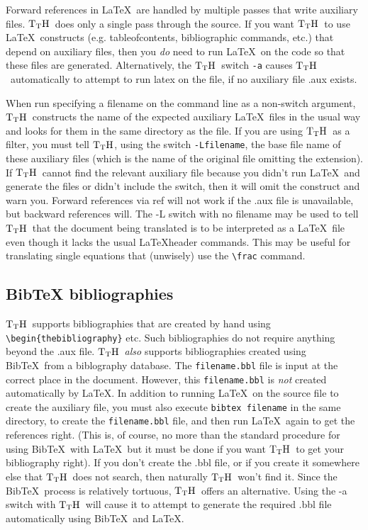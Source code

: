 \documentclass[12pt]{article}
\def\TtH{$\rm{}T_TH$}
\begin{document}
Forward references in \LaTeX\ are handled by multiple passes that write
auxiliary files. \TtH\ does only a single pass through the source.  If
you want \TtH\ to use \LaTeX\ constructs (e.g. tableofcontents,
bibliographic commands, etc.) that depend on auxiliary files, then
you {\em do} need to run \LaTeX\ on the code so that these files are
generated. Alternatively, the \TtH\ switch
\verb+-a+  
causes \TtH\ automatically to attempt to run latex on the file,
if no auxiliary file .aux exists.

When run specifying a filename on the command line as a non-switch
argument, \TtH\ constructs the name of the expected auxiliary \LaTeX\
files in the usual way and looks for them in the same directory as the
file. 
If you are using \TtH\ as a filter, you must tell \TtH, using the
switch \verb!-Lfilename!, the base file name of these auxiliary files
(which is the name of the original file omitting the extension). If
\TtH\ cannot find the relevant auxiliary file because you didn't run
\LaTeX\ and generate the files or didn't include the switch, then it
will omit the construct and warn you.\index{references!forward}
Forward references via ref will not work if the .aux file is
unavailable, but backward references will. The -L switch with no
filename may be used to tell \TtH\ that the document being translated
is to be interpreted as a \LaTeX\ file even though it lacks the usual
\LaTeX header commands. This may be useful for translating single
equations that (unwisely) use the \verb|\frac| command.


\subsection{BibTeX bibliographies\label{bibtex}}

\TtH\ supports bibliographies that are created by hand using
\verb!\begin{thebibliography}! etc. Such bibliographies do not require
anything beyond the .aux file. \TtH\ \emph{also} supports
bibliographies created using Bib\TeX\ from a biblography database. The
\verb!filename.bbl! file is input at the correct place in the
document. However, this \verb!filename.bbl!  is \emph{not} created
automatically by \LaTeX. In addition to running \LaTeX\ on the source
file to create the auxiliary file, you must also execute
\verb!bibtex filename! in the same directory, to create the
\verb!filename.bbl! file, and then run \LaTeX\ again to get the
references right. (This is, of course, no more than the standard
procedure for using Bib\TeX\ with \LaTeX\ but it must be done if you
want \TtH\ to get your bibliography right). If you don't create the
.bbl file, or if you create it somewhere else that \TtH\ does not
search, then naturally \TtH\ won't find it. Since the Bib\TeX\ process
is relatively tortuous, \TtH\ offers an alternative. Using the -a
switch\index{a@-a switch}\index{switches|-a} with \TtH\ will cause it
to attempt to generate the required .bbl file automatically using
Bib\TeX\ and \LaTeX.
\end{document}
